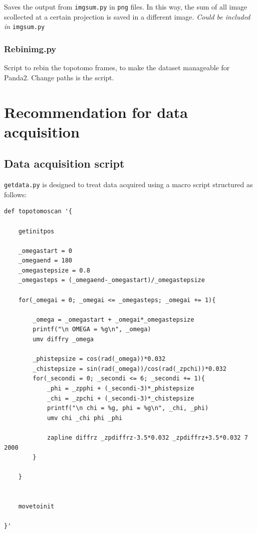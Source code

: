 \documentclass[11pt]{scrartcl}
\begin{document}
Saves the output from {\texttt{img\textunderscore sum.py}} in {\texttt{png}} files. In this way, the sum of all image scollected at a certain projection is saved in a different image. {\textit{Could be included in}} {\texttt{img\textunderscore sum.py}}

\subsubsection{Rebin\textunderscore img.py}
\label{sub_s:rebin}

Script to rebin the topotomo frames, to make the dataset manageable for Panda2. Change paths is the script.

\section{Recommendation for data acquisition}\label{sec:data_acquisition}

\subsection{Data acquisition script}

{\texttt{getdata.py}} is designed to treat data acquired using a macro script structured as follows:

\begin{lstlisting}
def topotomoscan '{

    getinitpos
    
    _omegastart = 0
    _omegaend = 180
    _omegastepsize = 0.8
    _omegasteps = (_omegaend-_omegastart)/_omegastepsize

    for(_omegai = 0; _omegai <= _omegasteps; _omegai += 1){
        
        _omega = _omegastart + _omegai*_omegastepsize
        printf("\n OMEGA = %g\n", _omega)
        umv diffry _omega
        
        _phistepsize = cos(rad(_omega))*0.032
        _chistepsize = sin(rad(_omega))/cos(rad(_zpchi))*0.032
        for(_secondi = 0; _secondi <= 6; _secondi += 1){
            _phi = _zpphi + (_secondi-3)*_phistepsize
            _chi = _zpchi + (_secondi-3)*_chistepsize
            printf("\n chi = %g, phi = %g\n", _chi, _phi)
            umv chi _chi phi _phi
            
            zapline diffrz _zpdiffrz-3.5*0.032 _zpdiffrz+3.5*0.032 7 2000    
        }

    }
    
        
    movetoinit

}'
\end{lstlisting}
\end{document}
